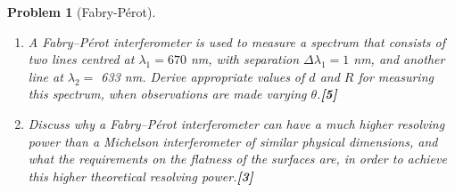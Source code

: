 \documentclass[a4paper]{article}
\theoremstyle{new}
\newtheorem{qns}{Problem}[subsection]
\begin{document}
\begin{qns}[Fabry-Pérot]
\begin{enumerate}[label=(\roman*)]
A quantity, $\mathcal{F}$, known as the finesse of the interferometer is defined as $\mathcal{F}=\frac{\Delta\lambda}{\delta\lambda}$, where $\delta\lambda$ is the full-width half-maximum of the transmission for a particular order. It can be shown that the finesse is approximately
$$\mathcal{F}=\frac{\pi R^{1/2}}{1-R}$$
\item A Fabry–Pérot interferometer is used to measure a spectrum that consists of two lines centred at $\lambda_1 = 670$ nm, with separation $\Delta\lambda_1=1$ nm, and another line at $\lambda_2=$ 633 nm. Derive appropriate values of $d$ and $R$ for measuring this spectrum, when observations are made varying $\theta$.\hfill\textbf{[5]}
\item Discuss why a Fabry–Pérot interferometer can have a much higher resolving power than a Michelson interferometer of similar physical dimensions, and what the requirements on the flatness of the surfaces are, in order to achieve this higher theoretical resolving power.\hfill\textbf{[3]}
\end{enumerate}
\end{qns}
\end{document}
